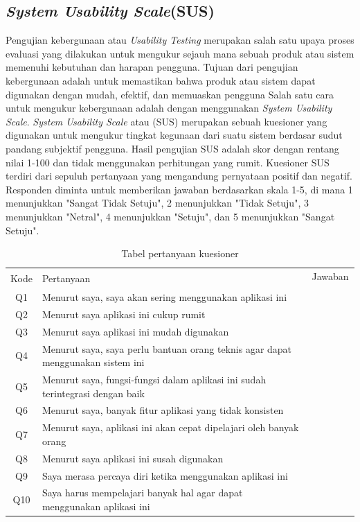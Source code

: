 \subsection{\textit{System Usability Scale}(SUS)}
Pengujian kebergunaan atau \textit{Usability Testing} merupakan salah satu upaya proses evaluasi yang dilakukan untuk mengukur sejauh mana sebuah produk atau sistem memenuhi kebutuhan dan harapan pengguna. 
Tujuan dari pengujian kebergunaan adalah untuk memastikan bahwa produk atau sistem dapat digunakan dengan mudah, efektif, dan memuaskan pengguna
Salah satu cara untuk mengukur kebergunaan adalah dengan menggunakan \textit{System Usability Scale}. \textit{System Usability Scale} atau (SUS) merupakan sebuah kuesioner yang digunakan untuk mengukur tingkat kegunaan dari suatu sistem berdasar sudut pandang subjektif pengguna.
Hasil pengujian SUS adalah skor dengan rentang nilai 1-100 dan tidak menggunakan perhitungan yang rumit. 
Kuesioner SUS terdiri dari sepuluh pertanyaan yang mengandung pernyataan positif dan negatif. 
Responden diminta untuk memberikan jawaban berdasarkan skala 1-5, di mana 1 menunjukkan "Sangat Tidak Setuju", 2 menunjukkan "Tidak Setuju", 3 menunjukkan "Netral", 4 menunjukkan "Setuju", dan 5 menunjukkan "Sangat Setuju".
\begin{table}[H]
	\caption{Tabel pertanyaan kuesioner}
	\label{Tabel pertanyaan kuesioner sus}
	\centering
	\begin{tabular}{|c|m{7cm}|m{0.5cm}|m{0.5cm}|m{0.5cm}|m{0.5cm}|m{0.5cm}|}
		\hline
		\multirow{2}{1cm}{Kode} & \multirow{2}{7cm}{\centering Pertanyaan}& \multicolumn{5}{c|}{\centering Jawaban} \\
		\cline{3-7}
		 & &\centering 1 & \centering  2 & \centering 3 & \centering 4 & \multicolumn{1}{m{0.5cm}|}{\centering 5} \\
		 \hline
		 Q1&Menurut saya, saya akan sering menggunakan aplikasi ini& &  &  &  &  \\
		 \hline
		 Q2&Menurut saya aplikasi ini cukup rumit& & & &  &  \\
		 \hline
		 Q3&Menurut saya aplikasi ini mudah digunakan& & & & & \\
		 \hline
		 Q4&Menurut saya, saya perlu bantuan orang teknis agar dapat menggunakan sistem ini& & & & & \\
		 \hline
		 Q5&Menurut saya, fungsi-fungsi dalam aplikasi ini sudah terintegrasi dengan baik& & & & & \\
		 \hline
		 Q6&Menurut saya, banyak fitur aplikasi yang tidak konsisten& & & & & \\
		 \hline
		 Q7&Menurut saya, aplikasi ini akan cepat dipelajari oleh banyak orang& & & & & \\
		 \hline
		 Q8&Menurut saya aplikasi ini susah digunakan& & & & & \\
		 \hline
		 Q9&Saya merasa percaya diri ketika menggunakan aplikasi ini& & & & & \\
		 \hline
		 Q10&Saya harus mempelajari banyak hal agar dapat menggunakan aplikasi ini& & & & & \\
		 \hline
	\end{tabular}
\end{table}
